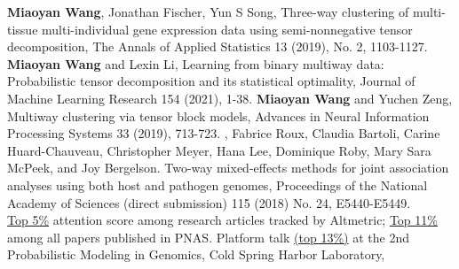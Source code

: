\documentclass[11pt]{article}
\theoremstyle{exampstyle}
\theoremstyle{definition}
\begin{document}
{\def\section*#1{\bf \Large References}
\begin{thebibliography}{9}
\normalsize
{} {\bf Miaoyan Wang}, Jonathan Fischer, Yun S Song, Three-way clustering of multi-tissue multi-individual gene expression data using semi-nonnegative tensor decomposition, The Annals of Applied Statistics 13 (2019), No. 2, 1103-1127.
 {\bf Miaoyan Wang} and Lexin Li, Learning from binary multiway data: Probabilistic tensor decomposition and its statistical optimality, Journal of Machine Learning Research 154 (2021), 1-38.
 {\bf Miaoyan Wang} and Yuchen Zeng, Multiway clustering via tensor block models, Advances in Neural Information Processing Systems 33 (2019), 713-723.
, Fabrice Roux, Claudia Bartoli, Carine Huard-Chauveau, Christopher Meyer, Hana Lee, Dominique Roby, Mary Sara McPeek, and Joy Bergelson. Two-way mixed-effects methods for joint association analyses using both host and pathogen genomes, Proceedings of the National Academy of Sciences (direct submission) 115 (2018) No. 24, E5440-E5449. \\
\underline{Top 5\%} attention score among research articles tracked by Altmetric; \underline{Top 11\%} among all papers published in PNAS.
Platform talk \underline{(top 13\%)} at the 2nd Probabilistic Modeling in Genomics, Cold Spring Harbor Laboratory, 


\end{thebibliography}}
\end{document}
